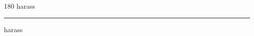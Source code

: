 
\begin{frame}
\begin{center}
\begin{turn}{180}
{\fontsize{2.5cm}{1em}\selectfont harass}
\end{turn}
\vspace{1em}\par  
\hrule
\vspace{1em}\par  
{\fontsize{2.5cm}{1em}\selectfont harass}
\end{center}
\end{frame}
